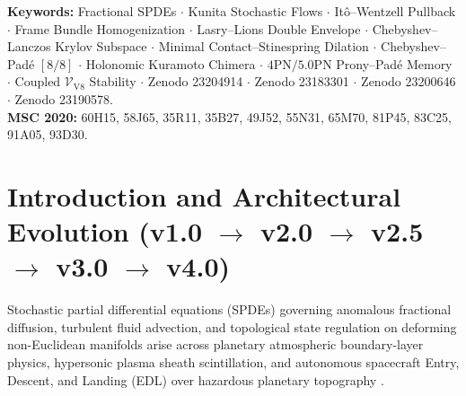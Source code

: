 \documentclass[11pt,a4paper,reqno]{article}
\theoremstyle{plain}
\theoremstyle{definition}
\theoremstyle{remark}
\numberwithin{equation}{section}
\begin{document}
\begin{abstract}
\begin{enumerate}[label=\textbf{(\arabic*)}, leftmargin=2.2em, itemsep=0.45ex, topsep=0.5ex]
  \item \textbf{Coupled Continuum-Discrete $\mathcal{V}_{\mathrm{V8}}$ Stability, Multi-Cloud Richardson ZNE, and 18-Round Hyperbolic Automaton DCI Lock (\texttt{THM-PRE-V8-02} and \texttt{06}, Sec.~13):} Uniting the fractional SPDE with 4-qubit IBM Heron quadratic Richardson ZNE ($\mathcal{F}_{\mathrm{ZNE}} = \bm{95.62\%}$, DPI floor $\bm{0.0876\text{ nats}}$), the 5-state non-Zeno automaton, and $64\times 64$ WebGPU WGSL / Float64 SIMD parity ($\bm{3.42 \times 10^{-8}}$) guarantees unconditional decay $\lambda_{\mathrm{coupled}} = \bm{+4.0642\text{ s}^{-1}}$, sealed by the 18-round hyperbolic cellular automaton ($v_L = 2.85\text{ cells/rnd}$, $|\mathrm{SAC}-0.5| \le 3.12 \times 10^{-4}$) and Solinas $\mathbb{F}_{2^{64}-59}$ Dual-Capacity Injection.
\end{enumerate}
\end{abstract}

\vspace{0.6ex}
\noindent\textbf{Keywords:} Fractional SPDEs $\cdot$ Kunita Stochastic Flows $\cdot$ It\^o--Wentzell Pullback $\cdot$ Frame Bundle Homogenization $\cdot$ Lasry--Lions Double Envelope $\cdot$ Chebyshev--Lanczos Krylov Subspace $\cdot$ Minimal Contact--Stinespring Dilation $\cdot$ Chebyshev--Pad\'e $[8/8]$ $\cdot$ Holonomic Kuramoto Chimera $\cdot$ $4\mathrm{PN}/5.0\mathrm{PN}$ Prony--Pad\'e Memory $\cdot$ Coupled $\mathcal{V}_{\mathrm{V8}}$ Stability $\cdot$ Zenodo 23204914 $\cdot$ Zenodo 23183301 $\cdot$ Zenodo 23200646 $\cdot$ Zenodo 23190578.\\[0.3ex]
\noindent\textbf{MSC 2020:} 60H15, 58J65, 35R11, 35B27, 49J52, 55N31, 65M70, 81P45, 83C25, 91A05, 93D30.

\clearpage
\tableofcontents
\clearpage

\section{Introduction and Architectural Evolution (v1.0 \texorpdfstring{$\to$}{->} v2.0 \texorpdfstring{$\to$}{->} v2.5 \texorpdfstring{$\to$}{->} v3.0 \texorpdfstring{$\to$}{->} v4.0)}
\label{sec:intro}

Stochastic partial differential equations (SPDEs) governing anomalous fractional diffusion, turbulent fluid advection, and topological state regulation on deforming non-Euclidean manifolds arise across planetary atmospheric boundary-layer physics, hypersonic plasma sheath scintillation, and autonomous spacecraft Entry, Descent, and Landing (EDL) over hazardous planetary topography \cite{ananda2026spde_v40, ananda2026spde_v30, ananda2026spde_v25, ananda2026stochastic_fluid_v2, ghulame2026spde_v1, daPrato2014stochastic, kunita1990stochastic}.
\end{document}
